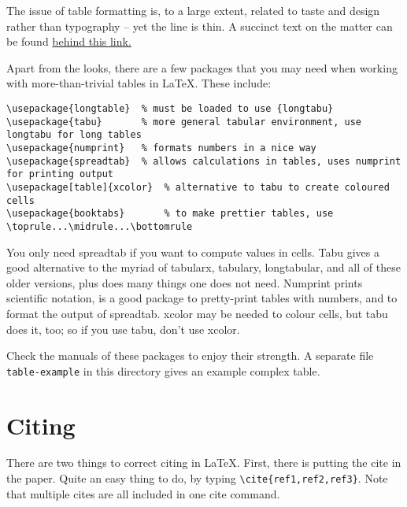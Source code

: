 \documentclass{article}
\begin{document}
The issue of table formatting is, to a large extent, related to taste and design rather than typography -- yet the line is thin.  A succinct text on the matter can be found \href{http://users.ece.cmu.edu/~pueschel/teaching/guides/guide-tables.pdf}{behind this link.}

Apart from the looks, there are a few packages that you may need when working with more-than-trivial tables in \LaTeX.  These include:
\begin{verbatim}
\usepackage{longtable}	% must be loaded to use {longtabu}
\usepackage{tabu}		% more general tabular environment, use longtabu for long tables
\usepackage{numprint}	% formats numbers in a nice way
\usepackage{spreadtab}	% allows calculations in tables, uses numprint for printing output
\usepackage[table]{xcolor}	% alternative to tabu to create coloured cells
\usepackage{booktabs}		% to make prettier tables, use \toprule...\midrule...\bottomrule
\end{verbatim}
You only need spreadtab if you want to compute values in cells.  Tabu gives a good alternative to the myriad of tabularx, tabulary, longtabular, and all of these older versions, plus does many things one does not need.  Numprint prints scientific notation, is a good package to pretty-print tables with numbers, and to format the output of spreadtab.  xcolor may be needed to colour cells, but tabu does it, too; so if you use tabu, don't use xcolor.

Check the manuals of these packages to enjoy their strength.  A separate file  \texttt{table-example} in this directory gives an example complex table.





\section{Citing}
There are two things to correct citing in \LaTeX.  First, there is putting the cite in the paper. Quite an easy thing to do, by typing \verb+\cite{ref1,ref2,ref3}+. Note that multiple cites are all included in one cite command.
\end{document}
